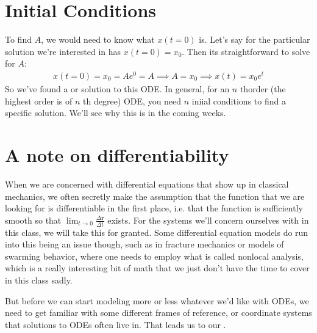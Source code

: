 \documentclass[letterpaper,10pt,english]{jupyterBook}
\begin{document}
\section{Initial Conditions}
\label{\detokenize{content/1_mechanics/mechanics_intro:initial-conditions}}
\sphinxAtStartPar
To find \(A\), we would need to know what \(x(t=0)\) is. Let’s say for the particular solution we’re interested in has \(x(t=0) = x_0\). Then its straightforward to solve for \(A\):
\begin{equation*}
\begin{split}
x(t=0) = x_0 = Ae^0 = A \implies A = x_0 \implies x(t) = x_0e^t
\end{split}
\end{equation*}
\sphinxAtStartPar
So we’ve found a  or  solution to this ODE. In general, for an \(n\) th\sphinxhyphen{}order (the highest order is of \(n\) th degree) ODE, you need \(n\) iniial conditions to find a specific solution. We’ll see why this is in the coming weeks.


\section{A note on differentiability}
\label{\detokenize{content/1_mechanics/mechanics_intro:a-note-on-differentiability}}
\sphinxAtStartPar
When we are concerned with differential equations that show up in classical mechanics, we often secretly make the assumption that the function that we are looking for is differentiable in the first place, i.e. that the function is sufficiently smooth so that \(\lim_{t\to 0} \frac{\Delta \mathbf{r}}{\Delta t}\) exists. For the systems we’ll concern ourselves with in this class, we will take this for granted. Some differential equation models do run into this being an issue though, such as in fracture mechanics or models of swarming behavior, where one needs to employ what is called nonlocal analysis, which is a really interesting bit of math that we just don’t have the time to cover in this class sadly.

\sphinxAtStartPar
But before we can start modeling more or less whatever we’d like with ODEs, we need to get familiar with some different frames of reference, or coordinate systems that solutions to ODEs often live in. That leads us to our .







\renewcommand{\indexname}{Index}
\printindex
\end{document}
